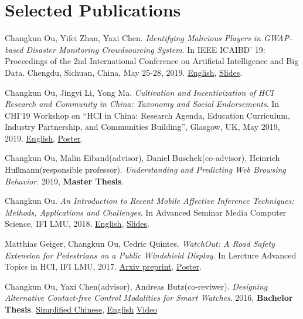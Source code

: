 \section{\textbf{Selected Publications}}
 \resumeSubHeadingListStart
    \item{
        Changkun Ou, Yifei Zhan, Yaxi Chen.
        \emph{Identifying Malicious Players in GWAP-based Disaster Monitoring Crowdsourcing System}. 
        In IEEE ICAIBD' 19: Proceedings of the 2nd International Conference on Artificial Intelligence and Big Data. Chengdu, Sichuan, China, May 25-28, 2019.
        \href{https://github.com/changkun/papers/blob/master/papers/ou2019gwap.pdf}{English},
        \href{https://github.com/changkun/papers/blob/master/papers/ou2019gwap-slides.pdf}{Slides}.
    }
    \item{
        Changkun Ou, Jingyi Li, Yong Ma.
        \emph{Cultivation and Incentivization of HCI Research and Community in China: Taxonomy and Social Endorsements}. 
        In CHI'19 Workshop on ``HCI in China: Research Agenda, Education Curriculum, Industry Partnership, and Communities Building'', Glasgow, UK, May 2019, 2019.
        \href{https://github.com/changkun/papers/blob/master/papers/ou2019chi-paper.pdf}{English},
        \href{https://github.com/changkun/papers/blob/master/papers/ou2019chi-poster.pdf}{Poster}.
    }
    \item{
        Changkun Ou, Malin Eiband(advisor), Daniel Buschek(co-advisor), Heinrich Hußmann(responsible professor).
        \emph{Understanding and Predicting Web Browsing Behavior}. 
        2019, \textbf{Master Thesis}.
    }
    \item{
        Changkun Ou.
        \emph{An Introduction to Recent Mobile Affective Inference Techniques: Methods, Applications and Challenges}.
        In Advanced Seminar Media Computer Science, IFI LMU, 2018. 
        \href{https://github.com/changkun/papers/blob/master/papers/ou2018hs-paper.pdf}{English}, 
        \href{hhttps://github.com/changkun/papers/blob/master/papers/ou2018hs-slides.pdf}{Slides}.
    }
    \item{
        Matthias Geiger, Changkun Ou, Cedric Quintes.
        \emph{WatchOut: A Road Safety Extension for Pedestrians on a Public Windshield Display}.
        In Lercture Advanced Topics in HCI, IFI LMU, 2017. 
        \href{https://arxiv.org/abs/1905.05390}{Arxiv preprint}. 
        \href{https://github.com/changkun/papers/blob/master/papers/ou2017ath-poster.pdf}{Poster}.
    }
    \item{
        Changkun Ou, Yaxi Chen(advisor), Andreas Butz(co-reviwer).
        \emph{Designing Alternative Contact-free Control Modalities for Smart Watches}. 
        2016, \textbf{Bachelor Thesis}. \href{https://github.com/changkun/papers/blob/master/papers/ou2016bachelor-cn.pdf}{Simplified Chinese}, 
        \href{https://github.com/changkun/papers/blob/master/papers/ou2016bachelor-en.pdf}{English} \href{https://www.youtube.com/watch?v=C2-5z7pIv98}{Video}
    }
